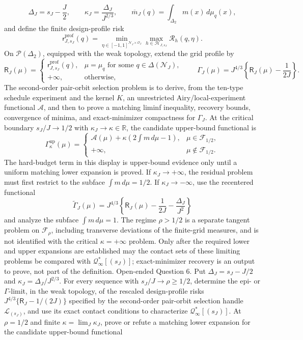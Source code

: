 \[
 \Delta_J=s_J-\frac J2,
 \qquad
 \kappa_J=\frac{\Delta_J}{J^{2/3}},
 \qquad
 \overline m_J(q)=\int_{\Delta_2}m(x)\,d\mu_q(x),
\]
and define the finite design-profile risk
\[
 \mathsf r^{\mathrm{prof}}_{J,s_J}(q)
 =\min_{\eta\in[-1,1]^{\mathcal N_J\times\mathcal O_J}}
   \max_{h\in\mathcal H_{J,s_J}}\mathcal R_h(q,\eta).
\]
On \(\mathcal P(\Delta_2)\), equipped with the weak topology, extend the grid profile by
\[
 \mathsf R_J(\mu)=
 \begin{cases}
 \mathsf r^{\mathrm{prof}}_{J,s_J}(q),&\mu=\mu_q\text{ for some }q\in\Delta(\mathcal N_J),\\
 +\infty,&\text{otherwise},
 \end{cases}
 \qquad
 \Gamma_J(\mu)=J^{4/3}\left\{\mathsf R_J(\mu)-\frac1{2J}\right\}.
\]
The second-order pair-orbit selection problem is to derive, from the ten-type schedule experiment and the kernel \(K\), an unrestricted Airy/local-experiment functional \(\mathcal A\), and then to prove a matching liminf inequality, recovery bounds, convergence of minima, and exact-minimizer compactness for \(\Gamma_J\). At the critical boundary \(s_J/J\to1/2\) with \(\kappa_J\to\kappa\in\mathbb R\), the candidate upper-bound functional is
\[
 \Gamma^{\mathrm{up}}_\kappa(\mu)
 =
 \begin{cases}
 \mathcal A(\mu)+\kappa\left(2\displaystyle\int m\,d\mu-1\right),
     &\mu\in\mathcal F_{1/2},\\
 +\infty,&\mu\notin\mathcal F_{1/2}.
 \end{cases}
\]
The hard-budget term in this display is upper-bound evidence only until a uniform matching lower expansion is proved. If \(\kappa_J\to+\infty\), the residual problem must first restrict to the subface \(\int m\,d\mu=1/2\). If \(\kappa_J\to-\infty\), use the recentered functional
\[
 \widetilde\Gamma_J(\mu)
 =J^{4/3}\left\{\mathsf R_J(\mu)-\frac1{2J}-\frac{\Delta_J}{J^2}\right\}
\]
and analyze the subface \(\int m\,d\mu=1\). The regime \(\rho>1/2\) is a separate tangent problem on \(\mathcal F_\rho\), including transverse deviations of the finite-grid measures, and is not identified with the critical \(\kappa=+\infty\) problem. Only after the required lower and upper expansions are established may the contact sets of these limiting problems be compared with \(\mathcal Q^*_{\infty}[(s_J)]\); exact-minimizer recovery is an output to prove, not part of the definition.
Open-ended Question 6. Put \(\Delta_J=s_J-J/2\) and \(\kappa_J=\Delta_J/J^{2/3}\). For every sequence with \(s_J/J\to\rho\ge1/2\), determine the epi- or \(\Gamma\)-limit, in the weak topology, of the rescaled design-profile risks \(J^{4/3}\{\mathsf R_J-1/(2J)\}\) specified by the second-order pair-orbit selection handle \(\mathcal L_{(s_J)}\), and use its exact contact conditions to characterize \(\mathcal Q^*_{\infty}[(s_J)]\). At \(\rho=1/2\) and finite \(\kappa=\lim_J\kappa_J\), prove or refute a matching lower expansion for the candidate upper-bound functional
